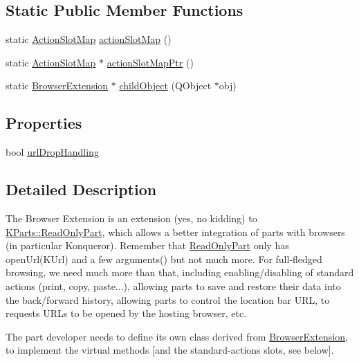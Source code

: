 \subsection*{\-Static \-Public \-Member \-Functions}
\begin{DoxyCompactItemize}
\item 
static \hyperlink{classKParts_1_1BrowserExtension_ac931bbd8189a4386b609180b5e704344}{\-Action\-Slot\-Map} \hyperlink{classKParts_1_1BrowserExtension_aa7f7e7ec66238e1fdca4e9354c2d9d18}{action\-Slot\-Map} ()
\item 
static \hyperlink{classKParts_1_1BrowserExtension_ac931bbd8189a4386b609180b5e704344}{\-Action\-Slot\-Map} $\ast$ \hyperlink{classKParts_1_1BrowserExtension_a1279e5f1b056f582536be9ef3c76f5f3}{action\-Slot\-Map\-Ptr} ()
\item 
static \hyperlink{classKParts_1_1BrowserExtension}{\-Browser\-Extension} $\ast$ \hyperlink{classKParts_1_1BrowserExtension_a4e0584a51eed738958ff3fe0ad82a202}{child\-Object} (\-Q\-Object $\ast$obj)
\end{DoxyCompactItemize}
\subsection*{\-Properties}
\begin{DoxyCompactItemize}
\item 
bool \hyperlink{classKParts_1_1BrowserExtension_a3f4216207e98c29842379e4abf2c1c06}{url\-Drop\-Handling}
\end{DoxyCompactItemize}


\subsection{\-Detailed \-Description}
\-The \-Browser \-Extension is an extension (yes, no kidding) to \hyperlink{classKParts_1_1ReadOnlyPart}{\-K\-Parts\-::\-Read\-Only\-Part}, which allows a better integration of parts with browsers (in particular \-Konqueror). \-Remember that \hyperlink{classKParts_1_1ReadOnlyPart}{\-Read\-Only\-Part} only has open\-Url(\-K\-Url) and a few arguments() but not much more. \-For full-\/fledged browsing, we need much more than that, including enabling/disabling of standard actions (print, copy, paste...), allowing parts to save and restore their data into the back/forward history, allowing parts to control the location bar \-U\-R\-L, to requests \-U\-R\-Ls to be opened by the hosting browser, etc.

\-The part developer needs to define its own class derived from \hyperlink{classKParts_1_1BrowserExtension}{\-Browser\-Extension}, to implement the virtual methods \mbox{[}and the standard-\/actions slots, see below\mbox{]}.

